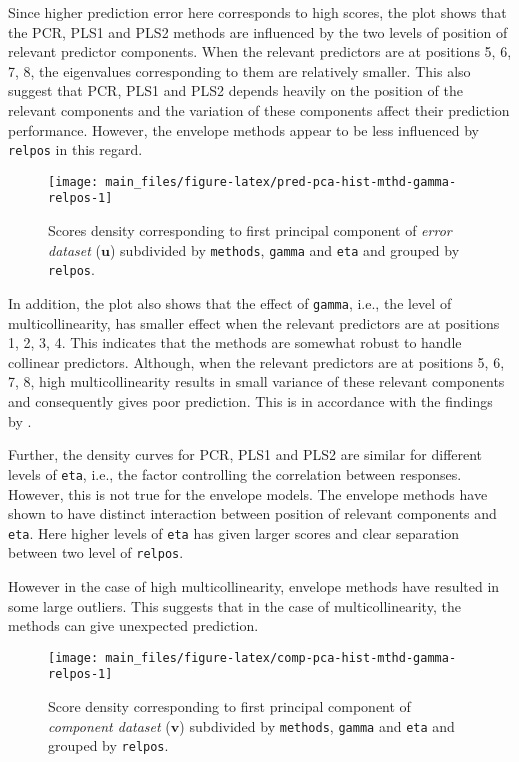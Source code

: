 \documentclass[12pt,3p,authoryear]{elsarticle}
\begin{document}
Since higher prediction error here corresponds to high scores, the plot
shows that the PCR, PLS1 and PLS2 methods are influenced by the two
levels of position of relevant predictor components. When the relevant
predictors are at positions 5, 6, 7, 8, the eigenvalues corresponding to
them are relatively smaller. This also suggest that PCR, PLS1 and PLS2
depends heavily on the position of the relevant components and the
variation of these components affect their prediction performance.
However, the envelope methods appear to be less influenced by
\texttt{relpos} in this regard.






\begin{figure}[!htb]
\texttt{[image: main\_files/figure-latex/pred-pca-hist-mthd-gamma-relpos-1]} \caption{Scores density corresponding to first principal
component of \emph{error dataset} (\(\mathbf{u}\)) subdivided by
\texttt{methods}, \texttt{gamma} and \texttt{eta} and grouped by
\texttt{relpos}.}\label{fig:pred-pca-hist-mthd-gamma-relpos}
\end{figure}

In addition, the plot also shows that the effect of \texttt{gamma},
i.e., the level of multicollinearity, has smaller effect when the
relevant predictors are at positions 1, 2, 3, 4. This indicates that the
methods are somewhat robust to handle collinear predictors. Although,
when the relevant predictors are at positions 5, 6, 7, 8, high
multicollinearity results in small variance of these relevant components
and consequently gives poor prediction. This is in accordance with the
findings by \citet{Helland1994b}.

Further, the density curves for PCR, PLS1 and PLS2 are similar for
different levels of \texttt{eta}, i.e., the factor controlling the
correlation between responses. However, this is not true for the
envelope models. The envelope methods have shown to have distinct
interaction between position of relevant components and \texttt{eta}.
Here higher levels of \texttt{eta} has given larger scores and clear
separation between two level of \texttt{relpos}.

However in the case of high multicollinearity, envelope methods have
resulted in some large outliers. This suggests that in the case of
multicollinearity, the methods can give unexpected prediction.






\begin{figure}[!htb]
\texttt{[image: main\_files/figure-latex/comp-pca-hist-mthd-gamma-relpos-1]} \caption{Score density corresponding to first principal component
of \emph{component dataset} (\(\mathbf{v}\)) subdivided by
\texttt{methods}, \texttt{gamma} and \texttt{eta} and grouped by
\texttt{relpos}.}\label{fig:comp-pca-hist-mthd-gamma-relpos}
\end{figure}
\end{document}
